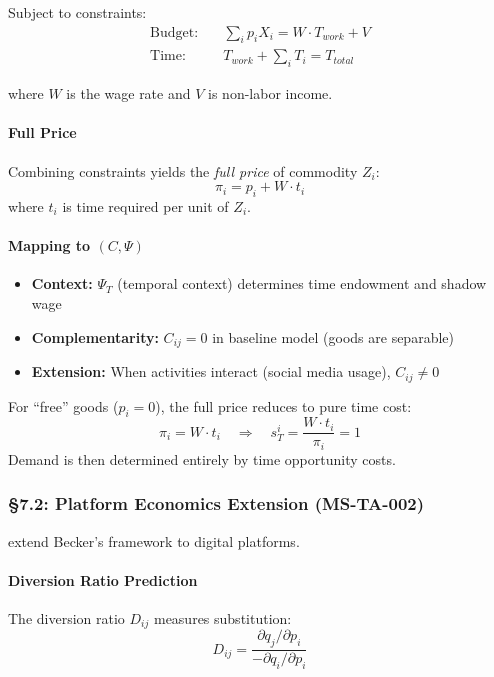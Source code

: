 Subject to constraints:
\begin{align}
\text{Budget:} \quad & \sum_i p_i X_i = W \cdot T_{work} + V \\
\text{Time:} \quad & T_{work} + \sum_i T_i = T_{total}
\end{align}

where $W$ is the wage rate and $V$ is non-labor income.

\paragraph{Full Price}
Combining constraints yields the \emph{full price} of commodity $Z_i$:
\begin{equation}
\pi_i = p_i + W \cdot t_i
\label{eq:der-full-price}
\end{equation}
where $t_i$ is time required per unit of $Z_i$.

\paragraph{Mapping to $(C, \Psi)$}
\begin{itemize}
\item \textbf{Context:} $\Psi_T$ (temporal context) determines time endowment and shadow wage
\item \textbf{Complementarity:} $C_{ij} = 0$ in baseline model (goods are separable)
\item \textbf{Extension:} When activities interact (social media usage), $C_{ij} \neq 0$
\end{itemize}

\begin{proposition}
\label{prop:der-ta1}
For ``free'' goods ($p_i = 0$), the full price reduces to pure time cost:
\[
\pi_i = W \cdot t_i \quad \Rightarrow \quad s_T^i = \frac{W \cdot t_i}{\pi_i} = 1
\]
Demand is then determined entirely by time opportunity costs.
\end{proposition}

\subsubsection{§7.2: Platform Economics Extension (MS-TA-002)}

\citet{goodman2026timeintensive} extend Becker's framework to digital platforms.

\paragraph{Diversion Ratio Prediction}
The diversion ratio $D_{ij}$ measures substitution:
\begin{equation}
D_{ij} = \frac{\partial q_j / \partial p_i}{-\partial q_i / \partial p_i}
\label{eq:der-diversion}
\end{equation}

